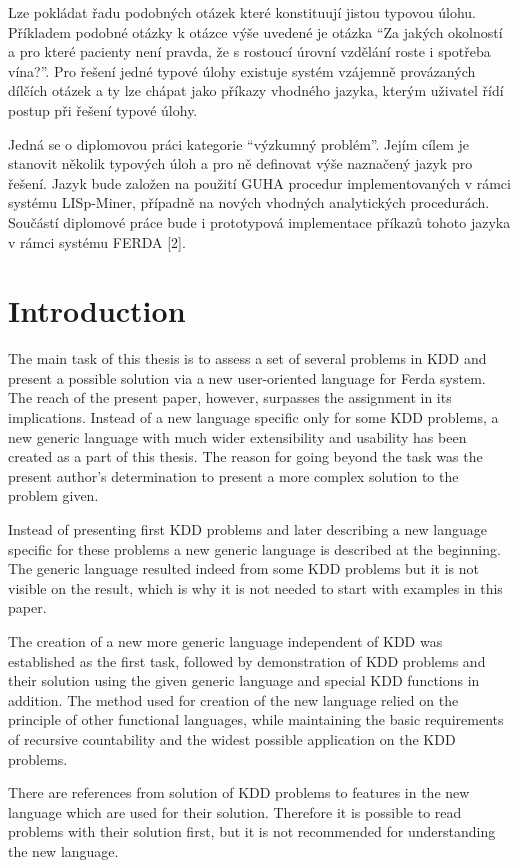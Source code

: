 \documentclass[a4paper,12pt]{book}
\newcommand{\uv}[1]{``#1''}
\begin{document}
Lze pokládat řadu podobných otázek které konstituují jistou typovou úlohu. Příkladem podobné otázky k otázce výše uvedené je otázka \uv{Za jakých okolností a pro které pacienty není pravda, že s rostoucí úrovní vzdělání roste i spotřeba vína?}. Pro řešení jedné typové úlohy existuje systém vzájemně provázaných dílčích otázek a ty lze chápat jako příkazy vhodného jazyka, kterým uživatel řídí postup při řešení typové úlohy.

Jedná se o diplomovou práci kategorie \uv{výzkumný problém}. Jejím cílem je stanovit několik typových úloh a pro ně definovat výše naznačený jazyk pro řešení. Jazyk bude založen na použití GUHA procedur implementovaných v rámci systému LISp-Miner, případně na nových vhodných analytických procedurách. Součástí diplomové práce bude i prototypová implementace příkazů tohoto jazyka v rámci systému FERDA [2].

\section*{Introduction}
The main task of this thesis is to assess a set of several problems in KDD and present a possible solution via a new user-oriented language for Ferda system. The reach of the present paper, however, surpasses the assignment in its implications. Instead of a new language specific only for some KDD problems, a new generic language with much wider extensibility and usability has been created as a part of this thesis. The reason for going beyond the task was the present author's determination to present a more complex solution to the problem given. 

Instead of presenting first KDD problems and later describing a new language specific for these problems a new generic language is described at the beginning. The generic language resulted indeed from some KDD problems but it is not visible on the result, which is why it is not needed to start with examples in this paper.

The creation of a new more generic language independent of KDD was established as the first task, followed by demonstration of KDD problems and their solution using the given generic language and special KDD functions in addition. The method used for creation of the new language relied on the principle of other functional languages, while maintaining the basic requirements of recursive countability and the widest possible application on the KDD problems.

There are references from solution of KDD problems to features in the new language which are used for their solution. Therefore it is possible to read problems with their solution first, but it is not recommended for understanding the new language.
\end{document}
